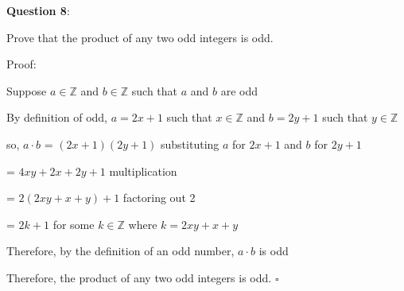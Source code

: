 \documentclass{article} %
\newcommand{\question}[2][]{\begin{flushleft}
        \textbf{Question #1}: \textit{#2}

\end{flushleft}}
\begin{document}
                                                                    

    \question[8]{}

    Prove that the product of any two odd integers is odd.

    Proof:

    Suppose $a \in \mathbb{Z}$ and $b \in \mathbb{Z}$ such that $a$ and $b$ are odd

    By definition of odd, $a = 2x + 1$ such that $x \in \mathbb{Z}$ and $b = 2y + 1$ such that $y \in \mathbb{Z}$

    so, $a \cdot b$ = $(2x + 1)(2y + 1)$ substituting $a$ for $2x + 1$ and $b$ for $2y + 1$

    \tabto*{1.78cm} = $4xy + 2x + 2y + 1$ multiplication

    \tabto*{1.78cm} = $2(2xy + x + y) + 1$ factoring out 2

    \tabto*{1.78cm} = $2k + 1$ for some $k \in \mathbb{Z}$ where $k = 2xy + x + y$

    Therefore, by the definition of an odd number, $a \cdot b$ is odd

    Therefore, the product of any two odd integers is odd. $\square$
    
\end{document}
